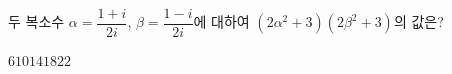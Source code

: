 두 복소수 $\alpha=\dfrac{1+i}{2i}$, $\beta=\dfrac{1-i}{2i}$에 대하여 $(2\alpha^2+3)(2\beta^2+3)$의 값은? 
\begin{choices32}{$6$}{$10$}{$14$}{$18$}{$22$}\end{choices32}

